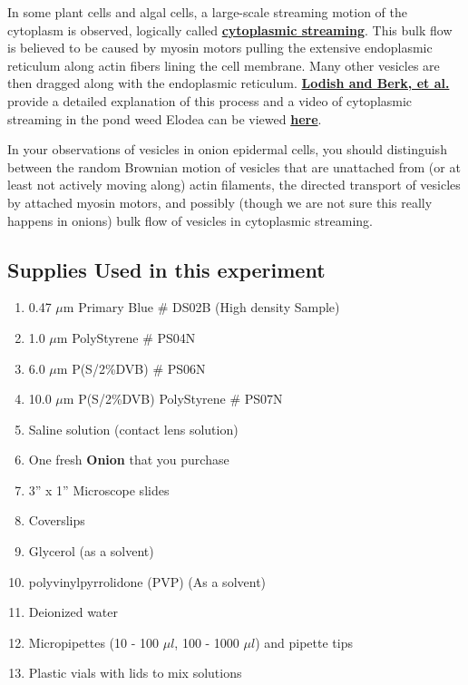 \documentclass{../lab}
\begin{document}
In some plant cells and algal cells, a large-scale streaming motion of the cytoplasm is observed, logically called \href{http://physics111.lib.berkeley.edu/Physics111/Reprints/OTZ/biowikipedia.pdf}{\textbf{cytoplasmic streaming}}. This bulk flow is believed to be caused by myosin motors pulling the extensive endoplasmic reticulum along actin fibers lining the cell membrane. Many other vesicles are then dragged along with the endoplasmic reticulum. \href{http://experimentationlab.berkeley.edu/sites/default/files/Lodish_and_Berk_Figure_18-40.pdf}{\textbf{Lodish and Berk, et al.}} provide a detailed explanation of this process and a video of cytoplasmic streaming in the pond weed Elodea can be viewed \href{http://experimentationlab.berkeley.edu/sites/default/files/Cytoplasmic_Streaming_Elodea.mov}{\textbf{here}}.

In your observations of vesicles in onion epidermal cells, you should distinguish between the random Brownian motion of vesicles that are unattached from (or at least not actively moving along) actin filaments, the directed transport of vesicles by attached myosin motors, and possibly (though we are not sure this really happens in onions) bulk flow of vesicles in cytoplasmic streaming.

\subsection{Supplies Used in this experiment}

\begin{enumerate}
    \item 0.47 $\mu$m Primary Blue \# DS02B (High density Sample)

    \item 1.0 $\mu$m PolyStyrene \# PS04N

    \item 6.0 $\mu$m P(S/2\%DVB) \# PS06N

    \item 10.0 $\mu$m P(S/2\%DVB) PolyStyrene \# PS07N

    \item Saline solution (contact lens solution)

    \item One fresh\textbf{ Onion} that you purchase

    \item 3'' x 1'' Microscope slides

    \item Coverslips

    \item Glycerol (as a solvent)

    \item polyvinylpyrrolidone (PVP) (As a solvent)

    \item Deionized water

    \item Micropipettes (10 - 100 $\mu l$, 100 - 1000 $\mu l$) and pipette tips

    \item Plastic vials with lids to mix solutions

\end{enumerate}
\end{document}
